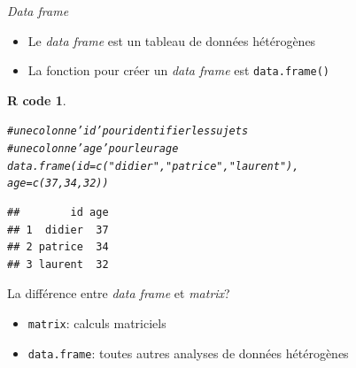 \documentclass[11pt]{beamer}\usepackage[]{graphicx}\usepackage[]{color}
\makeatletter
\newcommand{\hlnum}[1]{\textcolor[rgb]{0.063,0.58,0.627}{#1}}%
\newcommand{\hlstr}[1]{\textcolor[rgb]{0.063,0.58,0.627}{#1}}%
\newcommand{\hlcom}[1]{\textcolor[rgb]{0.588,0.588,0.588}{#1}}%
\newcommand{\hlstd}[1]{\textcolor[rgb]{0.196,0.196,0.196}{#1}}%
\newcommand{\hlkwc}[1]{\textcolor[rgb]{0,0.631,0.314}{#1}}%
\newcommand{\hlkwd}[1]{\textcolor[rgb]{0.78,0.227,0.412}{#1}}%
\newenvironment{kframe}{%
 \def\at@end@of@kframe{}%
 \ifinner\ifhmode%
  \def\at@end@of@kframe{\end{minipage}}%
  \begin{minipage}{\columnwidth}%
 \fi\fi%
 \def\FrameCommand##1{\hskip\@totalleftmargin \hskip-\fboxsep
 \colorbox{shadecolor}{##1}\hskip-\fboxsep
     \hskip-\linewidth \hskip-\@totalleftmargin \hskip\columnwidth}%
 \MakeFramed {\advance\hsize-\width
   \@totalleftmargin\z@ \linewidth\hsize
   \@setminipage}}%
 {\par\unskip\endMakeFramed%
 \at@end@of@kframe}
\newenvironment{knitrout}{}{} %
\newtheorem{rcode}{R code}[section]
\newcommand{\code}[1]{\texttt{#1}}
\makeatother
\begin{document}
\begin{frame}[fragile]{\textit{Data frame}}

\begin{itemize}
  \setlength\itemsep{0.5em}
\item Le \textit{data frame} est un tableau de données hétérogènes
\pause \item La fonction pour créer un \textit{data frame} est \code{data.frame()}
\end{itemize}
\pause
\begin{knitrout}
\color{fgcolor}\begin{kframe}
\begin{rcode}\label{unnamed-chunk-21}\begin{alltt}
\hlcom{# une colonne 'id' pour identifier les sujets}
\hlcom{# une colonne 'age' pour leur age}
\hlkwd{data.frame}\hlstd{(}\hlkwc{id} \hlstd{=} \hlkwd{c}\hlstd{(}\hlstr{"didier"}\hlstd{,}\hlstr{"patrice"}\hlstd{,}\hlstr{"laurent"}\hlstd{),}
           \hlkwc{age} \hlstd{=} \hlkwd{c}\hlstd{(}\hlnum{37}\hlstd{,}\hlnum{34}\hlstd{,}\hlnum{32}\hlstd{))}
\end{alltt}
\begin{verbatim}
##        id age
## 1  didier  37
## 2 patrice  34
## 3 laurent  32
\end{verbatim}
\end{rcode}\end{kframe}
\end{knitrout}

\end{frame}




\begin{frame}[fragile]{La différence entre \textit{data frame} et \textit{matrix}?}

\begin{itemize}
  \setlength\itemsep{2em}
  \normalsize
\item \code{matrix}: calculs matriciels
\item \code{data.frame}: toutes autres analyses de données hétérogènes
\end{itemize}

\end{frame}
\end{document}
